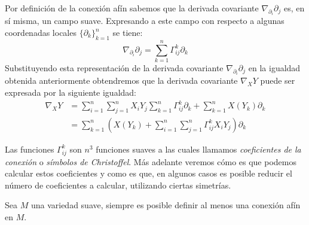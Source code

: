 Por definición de la conexión afín sabemos que la derivada covariante $\nabla_{\partial_{i}} \partial_{j}$ es, en sí misma, un campo suave. Expresando a este campo con respecto a algunas coordenadas locales $\{ \partial_{k} \}_{k=1}^{n}$ se tiene:
\[
	\nabla_{\partial_{i}}\partial_{j} = \sum_{k=1}^{n} \Gamma_{ij}^{k} \partial_{k}
\]
Substituyendo esta representación de la derivada covariante $\nabla_{\partial_{i}}\partial_{j}$ en la igualdad obtenida anteriormente obtendremos que la derivada covariante $\nabla_{X}Y$ puede ser expresada por la siguiente igualdad:
\begin{align*}
	\nabla_{X}Y
	 & = \sum_{i=1}^{n}\sum_{j=1}^{n} X_{i}Y_{j} \sum_{k=1}^{n} \Gamma_{ij}^{k} \partial_{k} + \sum_{k=1}^{n} X(Y_{k})\partial_{k} \\
	 & = \sum_{k=1}^{n} \left( X(Y_{k}) + \sum_{i=1}^{n}\sum_{j=1}^{n} \Gamma_{ij}^{k} X_{i}Y_{j} \right) \partial_{k}
\end{align*}

Las funciones $\Gamma_{ij}^{k}$ son $n^{3}$ funciones suaves a las cuales llamamos \textit{coeficientes de la conexión} o \textit{símbolos de Christoffel}. Más adelante veremos cómo es que podemos calcular estos coeficientes y como es que, en algunos casos es posible reducir el número de coeficientes a calcular, utilizando ciertas simetrías.

\begin{theorem}
  Sea $M$ una variedad suave, siempre es posible definir al menos una conexión afín en $M$.
\end{theorem}

